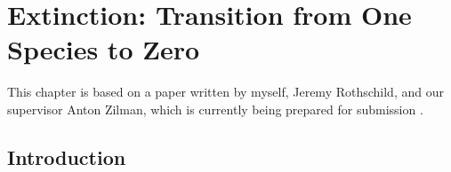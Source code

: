 \chapter{Extinction: Transition from One Species to Zero}%





This chapter is based on a paper written by myself, Jeremy Rothschild, and our supervisor Anton Zilman, which is currently being prepared for submission \cite{Badali2019b}. 

\section{Introduction} \label{Introduction}%


